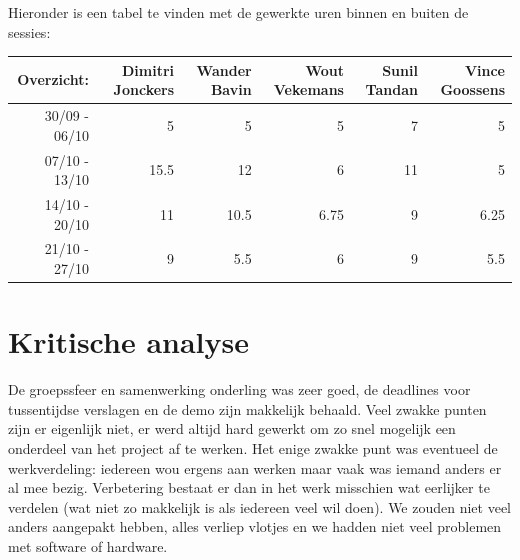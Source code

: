 \documentclass[tt]{penoverslag}
\begin{document}
Hieronder is een tabel te vinden met de gewerkte uren binnen en buiten de sessies: \\

\begin{tabular}{r||r|r|r|r|r}
Overzicht: & Dimitri Jonckers & Wander Bavin & Wout Vekemans & Sunil Tandan & Vince Goossens \\
\hline \hline 
30/09 - 06/10 & 5 & 5 & 5 & 7 & 5 \\
07/10 - 13/10 & 15.5 & 12 & 6 & 11 & 5 \\
14/10 - 20/10 & 11 & 10.5 & 6.75 & 9 & 6.25 \\
21/10 - 27/10 & 9 & 5.5 & 6 & 9 & 5.5 \\
\end{tabular}

\section{Kritische analyse}
\begin{itemize}
De groepssfeer en samenwerking onderling was zeer goed, de deadlines voor tussentijdse verslagen en de demo zijn makkelijk behaald. Veel zwakke punten zijn er eigenlijk niet, er werd altijd hard gewerkt om zo snel mogelijk een onderdeel van het project af te werken. Het enige zwakke punt was eventueel de werkverdeling: iedereen wou ergens aan werken maar vaak was iemand anders er al mee bezig. Verbetering bestaat er dan in het werk misschien wat eerlijker te verdelen (wat niet zo makkelijk is als iedereen veel wil doen). We zouden niet veel anders aangepakt hebben, alles verliep vlotjes en we hadden niet veel problemen met software of hardware.
\end{itemize}
\end{document}
